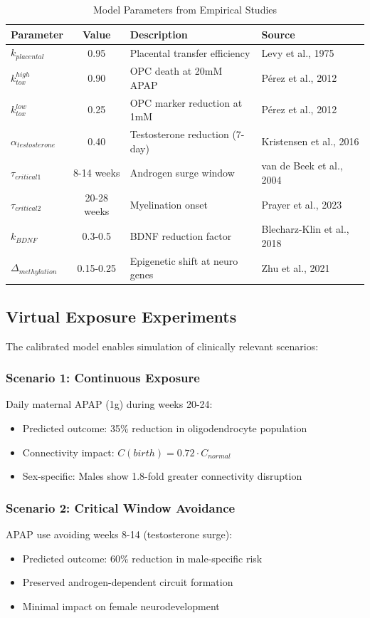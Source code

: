 \documentclass[11pt]{article}
\let\oldsubsection\subsection
\renewcommand{\subsection}[1]{\oldsubsection{#1}\setlength{\leftskip}{0.75em}}
\let\oldsubsubsection\subsubsection
\renewcommand{\subsubsection}[1]{\oldsubsubsection{#1}\setlength{\leftskip}{1.5em}}
\begin{document}
\begin{table}[h]
\caption{Model Parameters from Empirical Studies}
\centering
\begin{tabular}{|l|c|l|l|}
\hline
\textbf{Parameter} & \textbf{Value} & \textbf{Description} & \textbf{Source} \\
\hline
$k_{placental}$ & 0.95 & Placental transfer efficiency & Levy et al., 1975 \\
$k_{tox}^{high}$ & 0.90 & OPC death at 20mM APAP & Pérez et al., 2012 \\
$k_{tox}^{low}$ & 0.25 & OPC marker reduction at 1mM & Pérez et al., 2012 \\
$\alpha_{testosterone}$ & 0.40 & Testosterone reduction (7-day) & Kristensen et al., 2016 \\
$\tau_{critical1}$ & 8-14 weeks & Androgen surge window & van de Beek et al., 2004 \\
$\tau_{critical2}$ & 20-28 weeks & Myelination onset & Prayer et al., 2023 \\
$k_{BDNF}$ & 0.3-0.5 & BDNF reduction factor & Blecharz-Klin et al., 2018 \\
$\Delta_{methylation}$ & 0.15-0.25 & Epigenetic shift at neuro genes & Zhu et al., 2021 \\
\hline
\end{tabular}
\label{tab:model_parameters}
\end{table}

\subsection{Virtual Exposure Experiments}

The calibrated model enables simulation of clinically relevant scenarios:

\subsubsection{Scenario 1: Continuous Exposure}
Daily maternal APAP (1g) during weeks 20-24:
\begin{itemize}
\item Predicted outcome: 35\% reduction in oligodendrocyte population
\item Connectivity impact: $C(birth) = 0.72 \cdot C_{normal}$
\item Sex-specific: Males show 1.8-fold greater connectivity disruption
\end{itemize}

\subsubsection{Scenario 2: Critical Window Avoidance}
APAP use avoiding weeks 8-14 (testosterone surge):
\begin{itemize}
\item Predicted outcome: 60\% reduction in male-specific risk
\item Preserved androgen-dependent circuit formation
\item Minimal impact on female neurodevelopment
\end{itemize}
\end{document}
